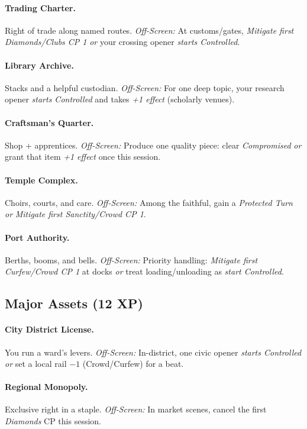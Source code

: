 \documentclass[11pt]{article}
\begin{document}
\paragraph{Trading Charter.} Right of trade along named routes.
\emph{Off-Screen:} At customs/gates, \emph{Mitigate first Diamonds/Clubs CP 1} \emph{or} your crossing opener \emph{starts Controlled}.

\paragraph{Library Archive.} Stacks and a helpful custodian.
\emph{Off-Screen:} For one deep topic, your research opener \emph{starts Controlled} and takes \emph{+1 effect} (scholarly venues).

\paragraph{Craftsman’s Quarter.} Shop + apprentices.
\emph{Off-Screen:} Produce one quality piece: clear \emph{Compromised} \emph{or} grant that item \emph{+1 effect} once this session.

\paragraph{Temple Complex.} Choirs, courts, and care.
\emph{Off-Screen:} Among the faithful, gain a \emph{Protected Turn} \emph{or} \emph{Mitigate first Sanctity/Crowd CP 1}.

\paragraph{Port Authority.} Berths, booms, and bells.
\emph{Off-Screen:} Priority handling: \emph{Mitigate first Curfew/Crowd CP 1} at docks \emph{or} treat loading/unloading as \emph{start Controlled}.

\subsection*{Major Assets (12 XP)}
\paragraph{City District License.} You run a ward’s levers.
\emph{Off-Screen:} In-district, one civic opener \emph{starts Controlled} \emph{or} set a local rail \emph{$-1$} (Crowd/Curfew) for a beat.

\paragraph{Regional Monopoly.} Exclusive right in a staple.
\emph{Off-Screen:} In market scenes, cancel the first \emph{Diamonds} CP this session.
\end{document}
